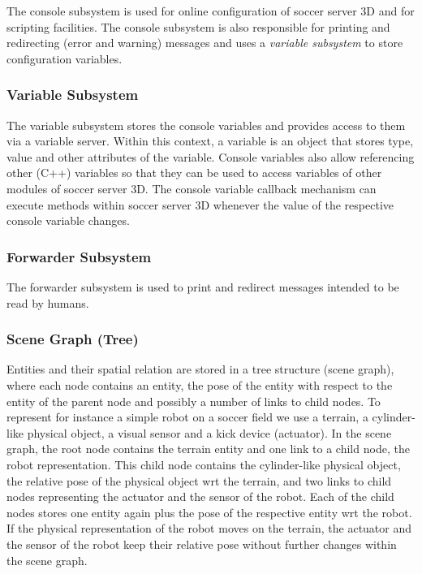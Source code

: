 \documentclass[a4paper,12pt]{article}
\begin{document}
The console subsystem is used for online configuration of soccer
server 3D and for scripting facilities. %
The console subsystem is also responsible for printing and redirecting
(error and warning) messages and uses a \emph{variable subsystem} to
store configuration variables. 


\subsubsection{Variable Subsystem}

The variable subsystem stores the console variables and provides
access to them via a variable server. Within this context, a variable
is an object that stores type, value and other attributes of the
variable.  Console variables also allow referencing other (C++)
variables so that they can be used to access variables of other
modules of soccer server 3D. The console variable callback mechanism
can execute methods within soccer server 3D whenever the value of the
respective console variable changes.

\subsubsection{Forwarder Subsystem}

The forwarder subsystem is used to print and redirect messages
intended to be read by humans. 

\subsubsection{Scene Graph (Tree)}

Entities and their spatial relation are stored in a tree
structure (scene graph), where each node contains an entity, the pose
of the entity with respect to the entity of the parent node and
possibly a number of links to child nodes. To represent for instance a
simple robot on a soccer field we use a terrain, a cylinder-like
physical object, a visual sensor and a kick device (actuator). In the
scene graph, the root node contains the terrain entity and one link to
a child node, the robot representation. This child node contains the
cylinder-like physical object, the relative pose of the physical
object wrt the terrain, and two links to child nodes representing the
actuator and the sensor of the robot. Each of the child nodes stores
one entity again plus the pose of the respective entity wrt the
robot. If the physical representation of the robot moves on the
terrain, the actuator and the sensor of the robot keep their relative
pose without further changes within the scene graph.
\end{document}
